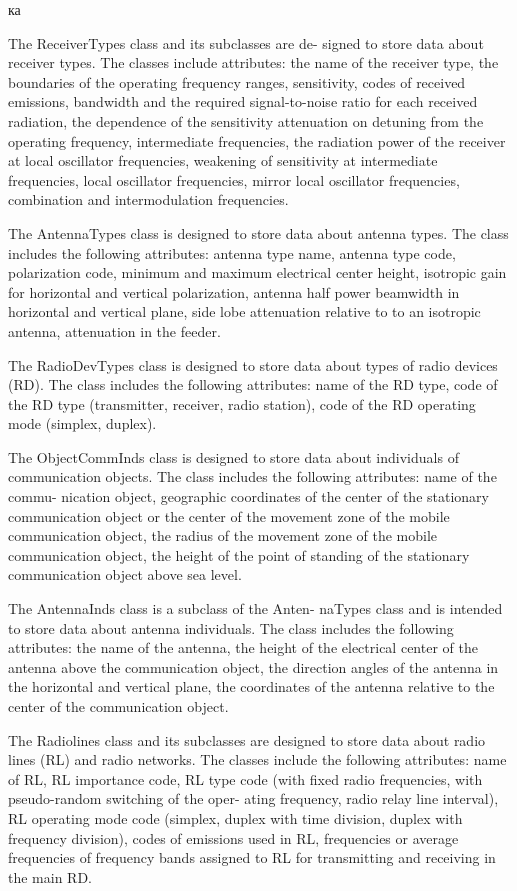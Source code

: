 ка\documentclass[times]{article}
\begin{document}
The ReceiverTypes class and its subclasses are de- signed to store data about receiver types. The classes include attributes: the name of the receiver type, the boundaries of the operating frequency ranges, sensitivity, codes of received emissions, bandwidth and the required signal-to-noise ratio for each received radiation, the dependence of the sensitivity attenuation on detuning from the operating frequency, intermediate frequencies, the radiation power of the receiver at local oscillator frequencies, weakening of sensitivity at intermediate frequencies, local oscillator frequencies, mirror local oscillator frequencies, combination and intermodulation frequencies.

The AntennaTypes class is designed to store data about antenna types. The class includes the following attributes: antenna type name, antenna type code, polarization code, minimum and maximum electrical center height, isotropic gain for horizontal and vertical polarization, antenna half power beamwidth in horizontal and vertical plane, side lobe attenuation relative to to an isotropic antenna, attenuation in the feeder.

The RadioDevTypes class is designed to store data about types of radio devices (RD). The class includes the following attributes: name of the RD type, code of the RD type (transmitter, receiver, radio station), code of the RD operating mode (simplex, duplex).

The ObjectCommInds class is designed to store data about individuals of communication objects. The class includes the following attributes: name of the commu- nication object, geographic coordinates of the center of the stationary communication object or the center of the movement zone of the mobile communication object, the radius of the movement zone of the mobile communication object, the height of the point of standing of the stationary communication object above sea level.

The AntennaInds class is a subclass of the Anten- naTypes class and is intended to store data about antenna individuals. The class includes the following attributes: the name of the antenna, the height of the electrical center of the antenna above the communication object, the direction angles of the antenna in the horizontal and vertical plane, the coordinates of the antenna relative to the center of the communication object.

The Radiolines class and its subclasses are designed to store data about radio lines (RL) and radio networks. The classes include the following attributes: name of RL, RL importance code, RL type code (with fixed radio frequencies, with pseudo-random switching of the oper- ating frequency, radio relay line interval), RL operating mode code (simplex, duplex with time division, duplex with frequency division), codes of emissions used in RL, frequencies or average frequencies of frequency bands assigned to RL for transmitting and receiving in the main RD.
\end{document}
